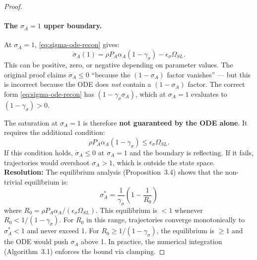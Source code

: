 \begin{proof}
\paragraph{The $\sigma_A = 1$ upper boundary.}
At $\sigma_A = 1$, \eqref{eq:sigma-ode-recon} gives:
\[
\dot{\sigma}_A(1) = \rho P_A \alpha_A (1 - \gamma_\sigma) - \epsilon_\sigma \Omega_{SL}.
\]
This can be positive, zero, or negative depending on parameter values.
The original proof claims $\dot{\sigma}_A \leq 0$ ``because the
$(1-\sigma_A)$ factor vanishes'' --- but this is incorrect because the
ODE does \emph{not} contain a $(1-\sigma_A)$ factor. The correct form
\eqref{eq:sigma-ode-recon} has $(1 - \gamma_\sigma \sigma_A)$, which at
$\sigma_A = 1$ evaluates to $(1 - \gamma_\sigma) > 0$.

The saturation at $\sigma_A = 1$ is therefore \textbf{not guaranteed by
the ODE alone}. It requires the additional condition:
\begin{equation}\label{eq:upper-bound-condition}
\rho P_A \alpha_A (1 - \gamma_\sigma) \leq \epsilon_\sigma \Omega_{SL}.
\end{equation}
If this condition holds, $\dot{\sigma}_A \leq 0$ at $\sigma_A = 1$ and the
boundary is reflecting. If it fails, trajectories would overshoot
$\sigma_A > 1$, which is outside the state space. \textbf{Resolution:}
The equilibrium analysis (Proposition~3.4) shows that the non-trivial
equilibrium is:
\[
\sigma_A^* = \frac{1}{\gamma_\sigma}\left(1 - \frac{1}{R_0}\right)
\]
where $R_0 = \rho P_A \alpha_A / (\epsilon_\sigma \Omega_{SL})$. This
equilibrium is $< 1$ whenever $R_0 < 1/(1 - \gamma_\sigma)$. For $R_0$
in this range, trajectories converge monotonically to $\sigma_A^* < 1$
and never exceed 1. For $R_0 \geq 1/(1 - \gamma_\sigma)$, the equilibrium
is $\geq 1$ and the ODE would push $\sigma_A$ above 1. In practice,
the numerical integration (Algorithm~3.1) enforces the bound via
clamping.


\end{proof}
